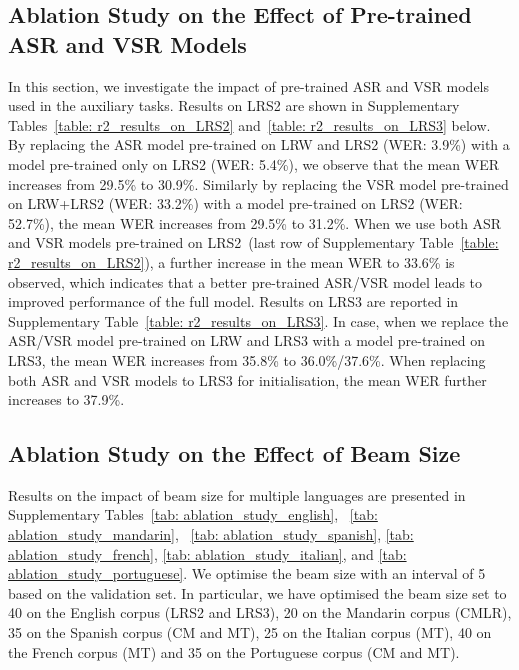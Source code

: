 \documentclass[twocolumn]{article}
\begin{document}
\subsection{Ablation Study on the Effect of Pre-trained ASR and VSR Models}
In this section, we investigate the impact of pre-trained ASR and VSR models used in the auxiliary tasks. Results on LRS2 are shown in Supplementary Tables~\ref{table: r2_results_on_LRS2} and~\ref{table: r2_results_on_LRS3} below. By replacing the ASR model pre-trained on LRW and LRS2 (WER: 3.9\%) with a model pre-trained only on LRS2 (WER: 5.4\%), we observe that the mean WER increases from 29.5\% to 30.9\%. Similarly by replacing the VSR model pre-trained on LRW+LRS2 (WER: 33.2\%) with a model pre-trained on LRS2 (WER: 52.7\%), the mean WER increases from 29.5\% to 31.2\%. When we use both ASR and VSR models pre-trained on LRS2~(last row of Supplementary Table~\ref{table: r2_results_on_LRS2}), a further increase in the mean WER to 33.6\% is observed, which indicates that a better pre-trained ASR/VSR model leads to improved performance of the full model. Results on LRS3 are reported in Supplementary Table~\ref{table: r2_results_on_LRS3}. In case, when we replace the ASR/VSR model pre-trained on LRW and LRS3 with a model pre-trained on LRS3, the mean WER increases from 35.8\% to 36.0\%/37.6\%. When replacing both ASR and VSR models to LRS3 for initialisation, the mean WER further increases to 37.9\%.

\subsection{Ablation Study on the Effect of Beam Size}
Results on the impact of beam size for multiple languages are presented in Supplementary Tables~\ref{tab: ablation_study_english}, ~\ref{tab: ablation_study_mandarin}, ~\ref{tab: ablation_study_spanish}, \ref{tab: ablation_study_french}, \ref{tab: ablation_study_italian}, and \ref{tab: ablation_study_portuguese}. We optimise the beam size with an interval of 5 based on the validation set. In particular, we have optimised the beam size set to 40 on the English corpus (LRS2 and LRS3), 20 on the Mandarin corpus (CMLR), 35 on the Spanish corpus (CM and MT), 25 on the Italian corpus (MT), 40 on the French corpus (MT) and 35 on the Portuguese corpus (CM and MT).
\end{document}
